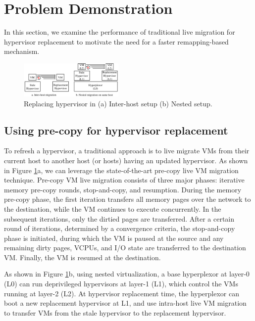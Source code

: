 \section{Problem Demonstration}
\label{sec:motiv}
In this section, we examine the performance of traditional live migration for hypervisor replacement 
to motivate the need for a faster remapping-based mechanism.

\begin{figure} 
	\centering
	\includegraphics[width=0.45\textwidth]{figures/setups.pdf}
	\caption{Replacing hypervisor in (a) Inter-host setup (b) Nested setup.}
	\label{fig:motivsetup}
\end{figure}

\subsection{Using pre-copy for hypervisor replacement}
 To refresh a hypervisor, a traditional approach is to live 
migrate VMs from their current host to another host (or hosts) having an updated hypervisor. 
As shown in Figure \ref{fig:motivsetup}a, we can leverage the  state-of-the-art pre-copy live 
VM migration technique. Pre-copy VM live migration consists of three major phases: iterative 
memory pre-copy rounds, stop-and-copy, and resumption.
During the memory pre-copy phase, the first iteration transfers all 
memory pages over the network to the destination, while the VM continues to execute concurrently. 
In the subsequent iterations, only the dirtied pages are transferred. 
After a certain round of iterations, determined by a convergence criteria, the stop-and-copy phase
is initiated, during which the VM is paused at the source and any remaining dirty pages, VCPUs, 
and I/O state are transferred to the destination VM. Finally, the VM is resumed at the destination.

 As shown in Figure \ref{fig:motivsetup}b, using nested virtualization, a base hyperplexor at layer-0 (L0) can run deprivileged hypervisors at layer-1 (L1), which control the VMs running at layer-2 (L2). At hypervisor replacement time, the hyperplexor can boot a new replacement hypervisor at L1, and use intra-host live VM migration to transfer VMs from the stale hypervisor to the replacement hypervisor.

